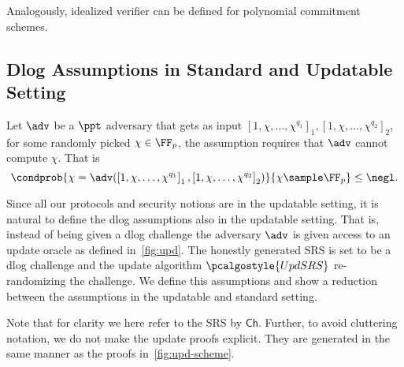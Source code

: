 \documentclass[10pt]{llncs}
\newcommand{\upd}{\pcalgostyle{UpdSRS}}
\newcommand{\pcvarstyle}[1]{\mathsf{#1}}
\newcommand{\mhyph}{\text{-}}
\newcommand{\bmap}[2] {\left[#1\right]_{#2}}
\newcommand{\gone}[1] {\bmap{#1}{1}}
\newcommand{\gtwo}[1] {\bmap{#1}{2}}
\newcommand{\reduction}{\rdv}
\newcommand{\Ch}{\pcvarstyle{Ch}}
\newcommand{\dlog}{\pcvarstyle{dlog}}
\newcommand{\ldlog}{\pcvarstyle{ldlog}}
\begin{document}
Analogously, idealized verifier can be defined for polynomial commitment schemes.

\subsection{Dlog Assumptions in Standard and Updatable Setting}
\label{dlog-upd}
\label{sec:udlog_assumptions}


\label{sec:dlog_assumptions}
\begin{definition}[$(q_1, q_2)\mhyph\dlog$ assumption]\label{def:dlog}
	Let $\adv$ be a $\ppt$ adversary that gets as input
	$\gone{1, \chi, \ldots, \chi^{q_1}}, \gtwo{1, \chi, \ldots, \chi^{q_2}}$, for
	some randomly picked $\chi \in \FF_p$, the assumption requires that $\adv$ cannot compute $\chi$. That is
	\[
	\condprob{\chi = \adv(\gone{1, \chi, \ldots, \chi^{q_1}}, \gtwo{1, \chi,
			\ldots, \chi^{q_2} })}{\chi \sample \FF_p} \leq \negl.
	\]
\end{definition}

Since all our protocols and security notions are in the updatable setting, it is natural to define the dlog assumptions also in the updatable setting. That is, instead of being given a dlog challenge the adversary $\adv$ is given access to an update oracle as defined in~\cref{fig:upd}. The honestly generated SRS is set to be a dlog challenge and the update algorithm $\upd$ re-randomizing the challenge. We define this assumptions and show a reduction between the assumptions in the updatable and standard setting. 

Note that for clarity we here refer to the SRS by $\Ch$. Further, to avoid cluttering notation, we do not make the update proofs explicit. They are generated in the same manner as the proofs in~\cref{fig:upd-scheme}.

\end{document}
